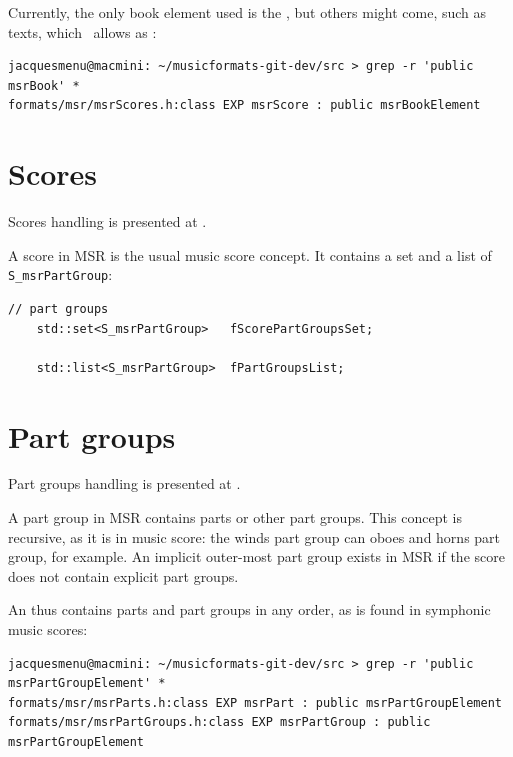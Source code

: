 Currently, the only book element used is the , but others might come, such as texts, which \lily\ allows as :
\begin{lstlisting}[language=Terminal]
jacquesmenu@macmini: ~/musicformats-git-dev/src > grep -r 'public msrBook' *
formats/msr/msrScores.h:class EXP msrScore : public msrBookElement
\end{lstlisting}


\section{Scores}\label{Scores}

Scores handling is presented at .

A score in MSR is the usual music score concept. It contains a set and a list of {\tt S_msrPartGroup}:
\begin{lstlisting}[language=CPlusPlus]
    // part groups
    std::set<S_msrPartGroup>   fScorePartGroupsSet;

    std::list<S_msrPartGroup>  fPartGroupsList;
\end{lstlisting}


\section{Part groups}\label{Part groups}

Part groups handling is presented at .

A part group in MSR contains parts or other part groups. This concept is recursive, as it is in music score: the winds part group can oboes and horns part group, for example.
An implicit outer-most part group exists in MSR if the score does not contain explicit part groups.

An  thus contains parts and part groups in any order, as is found in symphonic music scores:
\begin{lstlisting}[language=Terminal]
jacquesmenu@macmini: ~/musicformats-git-dev/src > grep -r 'public msrPartGroupElement' *
formats/msr/msrParts.h:class EXP msrPart : public msrPartGroupElement
formats/msr/msrPartGroups.h:class EXP msrPartGroup : public msrPartGroupElement
\end{lstlisting}

